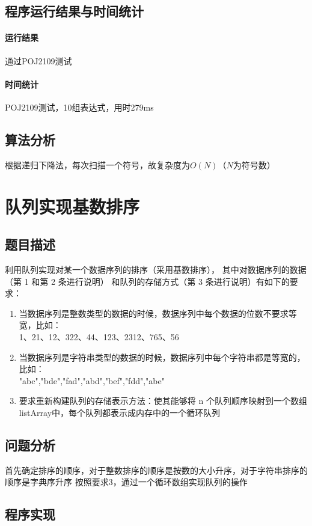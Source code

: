 \documentclass[UTF8]{ctexart}
\begin{document}
    \subsection{程序运行结果与时间统计}
      \paragraph{运行结果} 通过POJ2109测试
      \paragraph{时间统计} POJ2109测试，10组表达式，用时279ms

    \subsection{算法分析}
      根据递归下降法，每次扫描一个符号，故复杂度为$O(N)$（$N$为符号数）

  \section{队列实现基数排序}
    \subsection{题目描述}
      利用队列实现对某一个数据序列的排序（采用基数排序），
      其中对数据序列的数据（第 1 和第 2 条进行说明）
      和队列的存储方式（第 3 条进行说明）有如下的要求：
      \begin{enumerate}
        \item 当数据序列是整数类型的数据的时候，数据序列中每个数据的位数不要求等宽，比如： \\
        1、21、12、322、44、123、2312、765、56
        \item 当数据序列是字符串类型的数据的时候，数据序列中每个字符串都是等宽的，比如： \\
        "abc","bde","fad","abd","bef","fdd","abe"
        \item 要求重新构建队列的存储表示方法：使其能够将 n 个队列顺序映射到一个数组listArray中，每个队列都表示成内存中的一个循环队列
      \end{enumerate}
    \subsection{问题分析}
      首先确定排序的顺序，对于整数排序的顺序是按数的大小升序，对于字符串排序的顺序是字典序升序
      按照要求3，通过一个循环数组实现队列的操作
    \subsection{程序实现}
\end{document}
